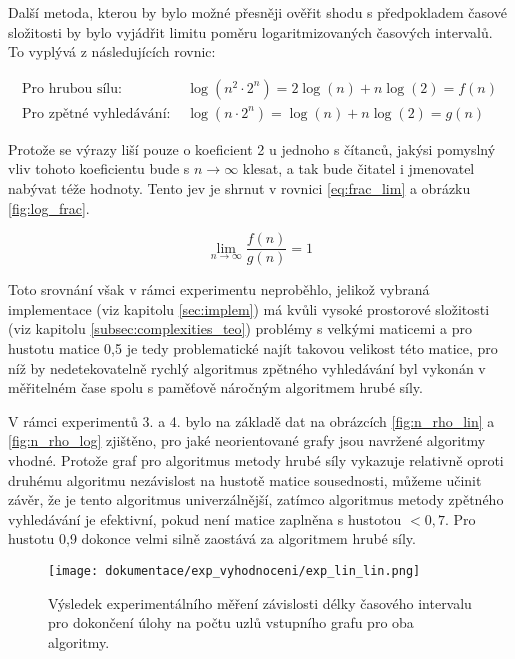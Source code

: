 \documentclass[a4paper]{article}
\begin{document}
        \noindent
        Další metoda, kterou by bylo možné přesněji ověřit shodu s předpokladem časové složitosti by bylo vyjádřit limitu poměru logaritmizovaných časových intervalů. To vyplývá z následujících rovnic:

        \begin{equation}
            \begin{aligned}
                \text{Pro hrubou sílu: }&\log{\left(n^2\cdot 2^n\right)} = 2\log{\left(n\right)}+n\log{\left(2 \right)} = f(n)\\
                \text{Pro zpětné vyhledávání: }&\log{\left(n\cdot 2^n\right)} = \log{\left(n\right)}+n\log{\left(2 \right)} = g(n)
            \end{aligned}
        \end{equation}

        \noindent
        Protože se výrazy liší pouze o koeficient 2 u jednoho s čítanců, jakýsi pomyslný vliv tohoto koeficientu bude s $n \rightarrow \infty$ klesat, a tak bude čitatel i jmenovatel nabývat téže hodnoty. Tento jev je shrnut v rovnici \ref{eq:frac_lim} a obrázku \ref{fig:log_frac}.
        
        \begin{equation} \label{eq:frac_lim}
            \lim_{n\to\infty}\frac{f(n)}{g(n)} = 1
        \end{equation}

        \noindent
        Toto srovnání však v rámci experimentu neproběhlo, jelikož vybraná implementace (viz kapitolu \ref{sec:implem}) má kvůli vysoké prostorové složitosti (viz kapitolu \ref{subsec:complexities_teo}) problémy s velkými maticemi a pro hustotu matice 0,5 je tedy problematické najít takovou velikost této matice, pro níž by nedetekovatelně rychlý algoritmus zpětného vyhledávání byl vykonán v měřitelném čase spolu s paměťově náročným algoritmem hrubé síly.

        \noindent
        V rámci experimentů 3. a 4. bylo na základě dat na obrázcích \ref{fig:n_rho_lin} a \ref{fig:n_rho_log} zjištěno, pro jaké neorientované grafy jsou navržené algoritmy vhodné. Protože graf pro algoritmus metody hrubé síly vykazuje relativně oproti druhému algoritmu nezávislost na hustotě matice sousednosti, můžeme učinit závěr, že je tento algoritmus univerzálnější, zatímco algoritmus metody zpětného vyhledávání je efektivní, pokud není matice zaplněna s hustotou $< 0,7$. Pro hustotu 0,9 dokonce velmi silně zaostává za algoritmem hrubé síly.
    

        \newpage
        \begin{figure}[H]
            \centering
            \texttt{[image: dokumentace/exp\_vyhodnoceni/exp\_lin\_lin.png]}
            \caption{Výsledek experimentálního měření závislosti délky časového intervalu pro dokončení úlohy na počtu uzlů vstupního grafu pro oba algoritmy.}
            \label{fig:exp_n_linlin}
        \end{figure}
\end{document}
